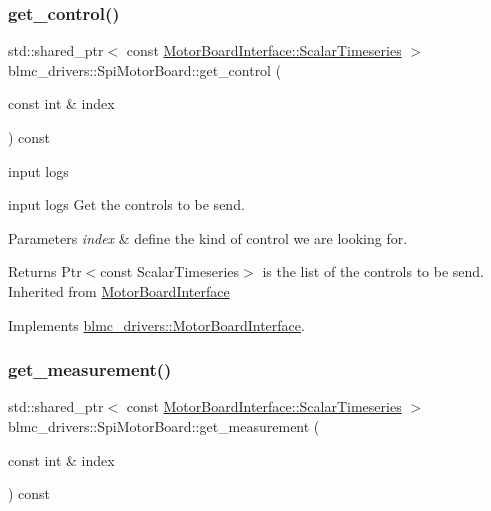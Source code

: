 \subsubsection{\texorpdfstring{get\+\_\+control()}{get\_control()}}
{\footnotesize\ttfamily std\+::shared\+\_\+ptr$<$ const \hyperlink{classblmc__drivers_1_1MotorBoardInterface_a14e237254ba495a66091ea3a3a33fa75}{Motor\+Board\+Interface\+::\+Scalar\+Timeseries} $>$ blmc\+\_\+drivers\+::\+Spi\+Motor\+Board\+::get\+\_\+control (\begin{DoxyParamCaption}\item[{const int \&}]{index }\end{DoxyParamCaption}) const\hspace{0.3cm}{\ttfamily [virtual]}}



input logs 

input logs Get the controls to be send.


\begin{DoxyParams}{Parameters}
{\em index} & define the kind of control we are looking for. \\
\hline
\end{DoxyParams}
\begin{DoxyReturn}{Returns}
Ptr$<$const Scalar\+Timeseries$>$ is the list of the controls to be send. Inherited from \hyperlink{classblmc__drivers_1_1MotorBoardInterface}{Motor\+Board\+Interface} 
\end{DoxyReturn}


Implements \hyperlink{classblmc__drivers_1_1MotorBoardInterface_aa5eeed12c851993f2e2c93f5479df9de}{blmc\+\_\+drivers\+::\+Motor\+Board\+Interface}.

\mbox{\label{classblmc__drivers_1_1SpiMotorBoard_af3793742536e6d8dc5f5782c460553fd}} 
\subsubsection{\texorpdfstring{get\+\_\+measurement()}{get\_measurement()}}
{\footnotesize\ttfamily std\+::shared\+\_\+ptr$<$ const \hyperlink{classblmc__drivers_1_1MotorBoardInterface_a14e237254ba495a66091ea3a3a33fa75}{Motor\+Board\+Interface\+::\+Scalar\+Timeseries} $>$ blmc\+\_\+drivers\+::\+Spi\+Motor\+Board\+::get\+\_\+measurement (\begin{DoxyParamCaption}\item[{const int \&}]{index }\end{DoxyParamCaption}) const\hspace{0.3cm}{\ttfamily [virtual]}}



